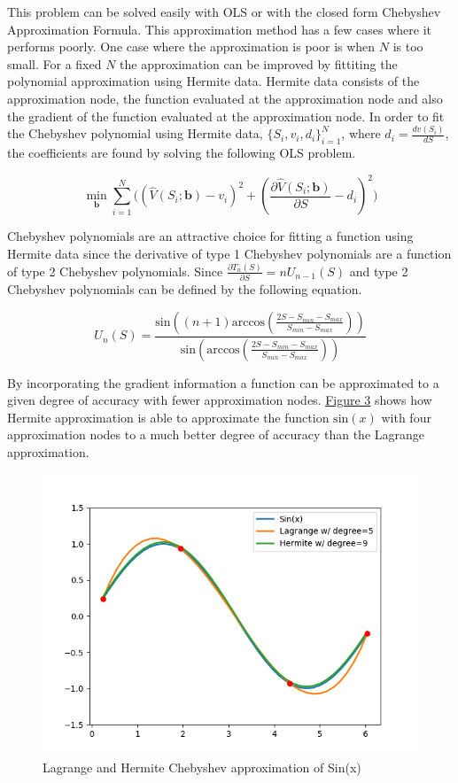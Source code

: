 \documentclass[12pt]{article}
\begin{document}
This problem can be solved easily with OLS or with the closed form Chebyshev Approximation Formula. This approximation method has a few cases where it performs poorly. One case where the approximation is poor is when $N$ is too small. For a fixed $N$ the approximation can be improved by fittiting the polynomial approximation using Hermite data. Hermite data consists of the approximation node, the function evaluated at the approximation node and also the gradient of the function evaluated at the approximation node. In order to fit the Chebyshev polynomial using Hermite data, $\{S_i,v_i,d_i\}_{i=1}^N$, where $d_i=\frac{d v(S_i)}{d S}$, the coefficients are found by solving the following OLS problem.

\begin{equation*}
  \min_{\boldsymbol{b}} \sum_{i=1}^N\bigg((\hat{V}(S_i;\boldsymbol{b})-v_i)^2 + (\frac{\partial \hat{V}(S_i;\boldsymbol{b})}{\partial S} - d_i)^2 \bigg)
\end{equation*}

Chebyshev polynomials are an attractive choice for fitting a function using Hermite data since the derivative of type 1 Chebyshev polynomials are a function of type 2 Chebyshev polynomials. Since $\frac{\partial T_n(S)}{\partial S} = n U_{n-1}(S)$ and type 2 Chebyshev polynomials can be defined by the following equation.

\begin{equation*}
  U_n(S) = \frac{\text{sin}((n+1) \text{arccos}(\frac{2S-S_{min}-S_{max}}{S_{min}-S_{max}}))}{\text{sin}(\text{arccos}(\frac{2S-S_{min}-S_{max}}{S_{min}-S_{max}}))}
\end{equation*}

By incorporating the gradient information a function can be approximated to a given degree of accuracy with fewer approximation nodes. \hyperref[ref_Cheb_Sin_Func]{Figure 3} shows how Hermite approximation is able to approximate the function $\text{sin}(x)$ with four approximation nodes to a much better degree of accuracy than the Lagrange approximation.

\begin{figure}[H]
  \centering
  \label{ref_Cheb_Sin_Func}
  \includegraphics[scale=.8]{plot_Cheb_Sin_Func}
  \caption{Lagrange and Hermite Chebyshev approximation of Sin(x)}
\end{figure}
\end{document}
